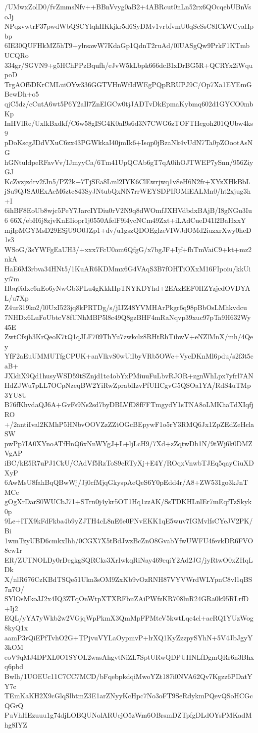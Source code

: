 /UMwxZolD0/fvZmmsNfv++BBnVvyg0aB2+4ABRcut0nLn52rx6QOcqebUBnVsoJj
NPqzvwtrF37pwdWbQSCYlqhHKkjkr5d6SyDMv1vrbfvmU0qScSsC8ICkWCyaHpbp
6IE30QUFHkMZ5hT9+ylrsawW7KdaGp1QdnT2ruAd/0lUASgQw9PrkF1KTmbUCQRo
334gr/SGVN9+g5HChPPzBqufh/eJvW5kLbpk666dcBIxDrBG5R+QCRYx2iWqupoD
TrgAOf5DKrCMLuiOYw336GGTVHnWfIdWEgPQpRRUPJ9C/Op7Xa1EYEmGBewDh+o5
qjC5dz/cCutA6wt5P6Y2aIl7ZnElGCw0tjJADTvDkEpmaKybmq602d1GYCO0mbKp
InHVlRe/UxlkBxdkf/C6w58gISG4K0aI9s6d3N7CWG6zTOFTHegoh201QUbw4ks9
pDoKscgJDdVXuC6zx43PGWkkaI40jmIk6+Isqp0jBzaNk4vUdN7Ta0pZOootAsNG
hGNtuldpeRFavVv/IJmyyCa/6Tm41UpQCAb6gT7qA0ihOJTWEP7ySnn/956ZiyGJ
KcZvzjzdrv2fJn5/PZ2k+7TjSEa8Lml2IYK6ClEwrjwq1v8eH6N2fr+XYzXHkBbL
jSu9QJSA0ExAeM6ztc843SyJNtubQxNN7rrWEYSDPIfOMiEALMn0/ht2xjug3h+I
6ihBF8EoUb8wjc5PeY7JarcIYDiu0rV2N9q8dWOmfJXHVdbdxBAjB/I8gNGu3Iu6
66X/ebH6j8zjvKnEIiopr1j0550AfelF9i4ycNCm49Zxt+iLAdCueD41l2BaHxxY
mjIpMGYMsD29ESjU9O0JZp1+dv/u1gszQDOEglzeVIWJdOMd2iuzxrXwy0heD1s3
WSoG/3sYWFgEaUH3/+xxx7FcU0om6QfgG/x7bgJF+Ijf+fhTmVaiC9+kt+mz2nkA
HaE6M3rbva34HNt5/1KuAR6KDMmx6G4VAqS3B7fOHTiOXxM16FIpoiu/kkUiyi7m
Hbq0idxc6nEo6yNwGb3PLu4gKkkHpTNYKDYhd+2EAzEEF0HZYzjcdOVDYAL/u7Xp
Z4ur319ko2/l0UxI523jq8kPRTDg/s/jIJZ48YVMHArPkgr6q98pBbOsLMhkvdcu
7NHDx6LuFoUbtcV8fUNhMBP5l8c49Q8gzBHF4mRaNqvp39xuc97pTa9H632Wy45E
ZwtCfsjh3KrQeoK7tQ1qJLF709ThYu7zwkclz8RHtRhTibwV+eNZlMnX/mh/4Qey
YfF2aEuUMMUTfgCPUK+anVlkvS0wUiIbyVRb5OWc+VycDKnMl6pdu/s2f3t5caB+
JXldiX9Qd1husyWSD59tSZnjd1tc4obYxPMiuuFuLbvRJOR+zgnWhLpx7yfrl7AN
HdZJWu7pLL7OCpNzeqBW2YiRwZprablIzvPfUHCgvG5QSOa1YA/RdS4uTMp3YU8U
B76fKhvdaQJ6A+GvFs9Ns2sd7byDBLVfD8fFFTmgydY1sTNA8oLMKhaTdXIqfjRO
+/2antiIval2KMhP5HNbvOOVZzZZtOGcBEpywF1o5rY3RMQ6Jx1ZpZEdZeHclaSW
pwPp7IA0XYnoATfHnQ6xNnWYgJ+L+ljLcH9/7Xd+zZqtwDb1N/9tWj6k0DMZVgAP
iBC/kE5R7uPJ1CkU/CAdVf5RzToS9cRTyXj+E4Y/ROqxVnwbTJEq5qayCiuXDXyP
6AwMsU8fahBqQBwWj/Jj0cfMjqGkyspAeQeS6Y0pEdd4r/A8+ZW531go3kJnTMCe
gOgXrDarS0WUCbJ71+STrn0j4ykr5OT1Hq1zzAK/SsTDKHLnlEr7mEqfTzSkyk0p
9Le+ITX9kFdFkba4b9yZJTH4cL8nE6e0FNvEKK1qE5wuv7IGMvlfsCYeJV2PK/Bi
1wmTzyUBD6cmkxIhh/0CGX7X5tBdJwzBcZnO8GvabYfwUWFU4fevkDR6FVO8cw1r
ER/ZUTNOLDy0rDegkgSQRCks3XrIwkqRiNay469eqiY2Ad2JG/jyRtwO0xZHqLDk
X/nlR676CzKBdTSQe51Ukn3sOM9ZxKb9vOzRNH87VYVWrdWLYpnC8vl1qBS7n7O/
SYlOsMkoJJ2x4IQ3ZTqOnWtpXTXRFbuZAiPWfzKR708luR24GRa0k95RLrfD+Ij2
EQL/yYA7yWkb2w2VGjqWpPkmX3QmMpFPMteV5kwtLqc4cl+acRQ1YUzWog8kyQ1x
aamP3rQiEPfTvhO2G+TPjvuVYLaOypmvP+lrXQ1KyZzzpySYhN+5V4JbJgyY3kOM
eoV9qMJ4DPXL0O1SYOL2wasAhgvtNiZL7SptURwQDPUHNLfDgmQRr6n3Bhxq6pbd
Bwlh/1UOEUc11C7CC7MCD/bFqebpkdqiMwoYZt187i0NVA62Qv7Kgzz6PDatYY7c
TEmKaKH2X9cGlqSlbtmZ3E1arZNyyKcHpc7No3oFT9SeRdykmPQevQSoHCGcQGrQ
PuVhHEzuuu1g74djLOBQUNolARUcjO5zWm6OBrsmDZTpfgDLdOYsPMKadMhg8IYZ
